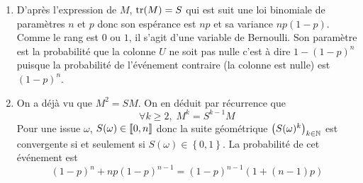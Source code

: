 \begin{enumerate}
  \item D'après l'expression de $M$, $\operatorname{tr}(M) = S$ qui est suit une loi binomiale de paramètres $n$ et $p$ donc son espérance est $np$ et sa variance $np(1-p)$.\newline
  Comme le rang est $0$ ou $1$, il s'agit d'une variable de Bernoulli. Son paramètre est la probabilité que la colonne $U$ ne soit pas nulle c'est à dire $1-(1-p)^n$ puisque la probabilité de l'événement contraire (la colonne est nulle) est $(1-p)^n$.
  
  \item On a déjà vu que $M^2 = SM$. On en déduit par récurrence que 
\begin{displaymath}
\forall k\geq 2, \; M^k = S^{k-1} M  
\end{displaymath}
Pour une issue $\omega$, $S(\omega)\in \llbracket 0,n\rrbracket$ donc la suite géométrique $\left( S(\omega)^k\right)_{k\in \mathbb{N}}$ est convergente si et seulement si $S(\omega)\in\left\lbrace 0,1\right\rbrace$. La probabilité de cet événement est 
\begin{displaymath}
(1-p)^n + np(1-p)^{n-1} = (1-p)^{n-1}(1+(n-1)p)  
\end{displaymath} 
\end{enumerate}

